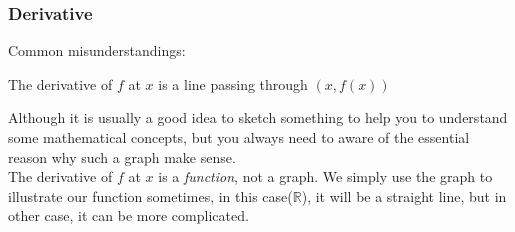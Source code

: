 \documentclass{beamer}
\begin{document}
\begin{frame}
    \frametitle{Derivative}
    Common misunderstandings:\\
    \vspace{0.5em}
    \begin{center}
        The derivative of $f$ at $x$ is a line passing through $(x,f(x))$
    \end{center}
    \vspace{0.5em}

    \hspace{1em} Although it is usually a good idea to sketch something to help you to understand some mathematical concepts, but you always need to
    aware of the essential reason why such a graph make sense.\\
    \vspace{1em}
    \hspace{1em} The derivative of $f$ at $x$ is a \emph{function}, not a graph. We simply use the graph to illustrate our function sometimes, in
    this case($\mathbb{R}$), it will be a straight line, but in other case, it can be more complicated.

    \hspace{1em}
\end{frame}
\end{document}
